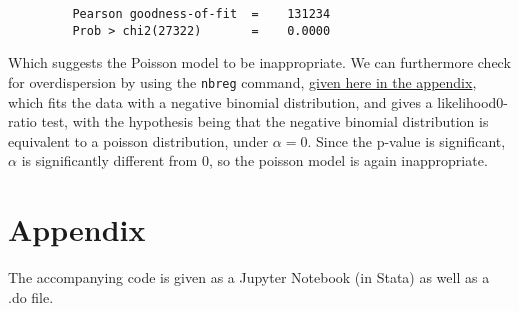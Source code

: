 \documentclass{article}
\begin{document}
\begin{enumerate}[label=(\alph*)]
\begin{verbatim}
         Pearson goodness-of-fit  =    131234
         Prob > chi2(27322)       =    0.0000
\end{verbatim}
Which suggests the Poisson model to be inappropriate. We can furthermore check for overdispersion by using the \texttt{nbreg} command, \hyperlink{nbreg}{given here in the appendix}, which fits the data with a negative binomial distribution, and gives a likelihood0-ratio test, with the hypothesis being that the negative binomial distribution is equivalent to a poisson distribution, under $\alpha = 0$. Since the p-value is significant, $\alpha$ is significantly different from 0, so the poisson model is again inappropriate.


\end{enumerate}

\newpage

\section{Appendix}
The accompanying code is given as a Jupyter Notebook (in Stata) as well as a .do file.
\end{document}
